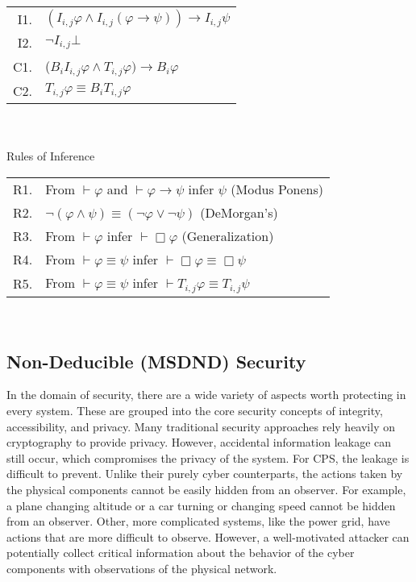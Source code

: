 \begin{table}[!t]
\begin{tabular}{r l}
I1. & $(I_{i,j} \varphi \wedge I_{i,j} (\varphi \rightarrow \psi )) \rightarrow I_{i,j} \psi$\\
I2. & $\neg I_{i,j} \bot$ \\
C1. & ($B_i I_{i,j} \varphi \wedge T_{i,j} \varphi) \rightarrow B_i \varphi$ \\
C2. & $T_{i,j} \varphi \equiv B_i T_{i,j} \varphi$ \\
\end{tabular} \\~\\
Rules of Inference \\
\begin{tabular}{r l}
R1. & From $\vdash \varphi$ and $\vdash \varphi \rightarrow \psi$ infer $\psi$ (Modus Ponens) \\
R2. & $\neg (\varphi \wedge \psi) \equiv (\neg \varphi \vee \neg \psi)$ (DeMorgan's)\\
R3. & From $\vdash \varphi$ infer $\vdash \Box \varphi$ (Generalization)\\
R4. & From $\vdash \varphi \equiv \psi$ infer $\vdash \Box \varphi \equiv \Box \psi$\\
R5. & From $\vdash \varphi \equiv \psi$ infer $\vdash T_{i,j} \varphi \equiv T_{i,j} \psi$\\
\end{tabular} \\
\label{tab:axiomatic}
\end{table}

\subsection{Non-Deducible (MSDND) Security}

In the domain of security, there are a wide variety of aspects worth protecting in every system.
These are grouped into the core security concepts of integrity, accessibility, and privacy.
Many traditional security approaches rely heavily on cryptography to provide privacy.
However, accidental information leakage can still occur, which compromises the privacy of the system.
For \ac{CPS}, the leakage is difficult to prevent.
Unlike their purely cyber counterparts, the actions taken by the physical components cannot be easily hidden from an observer.
For example, a plane changing altitude or a car turning or changing speed cannot be hidden from an observer.
Other, more complicated systems, like the power grid, have actions that are more difficult to observe. However, a well-motivated attacker can potentially collect critical information about the behavior of the cyber components with observations of the physical network\cite{Roth2012}.

